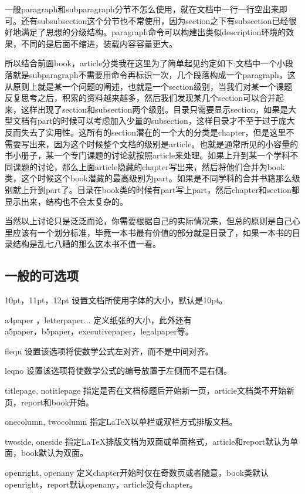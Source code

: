 \documentclass[12pt,oneside]{book}
\begin{document}
\begin{common-format}
一般paragraph和subparagraph分节不怎么使用，就在文档中一行一行空出来即可。还有subsubsection这个分节也不常使用，因为section之下有subsection已经很好地满足了思想的分级结构。paragraph命令可以构建出类似description环境的效果，不同的是后面不缩进，装载内容容量更大。

所以结合前面book，article分类我在这里为了简单起见约定如下:文档中一个小段落就是subparagraph不需要用命令再标识一次，几个段落构成一个paragraph，这从原则上就是某一个问题的阐述，也就是一个section级别，当我们对某一个课题反复思考之后，积累的资料越来越多，然后我们发现某几个section可以合并起来，这样出现了section和subsection两个级别。目录只需要显示section，如果是大型文档有part的时候可以考虑加入少量的subsection，这样目录才不至于过于庞大反而失去了实用性。这所有的section潜在的一个大的分类是chapter，但是这里不需要写出来，因为这个时候整个文档的级别是article。也就是通常所见的小容量的书小册子，某一个专门课题的讨论就按照article来处理。如果上升到某一个学科不同课题的讨论，那么上面article隐藏的chapter写出来，然后将他们合并为book类，这个时候这个book潜藏的最高级别为part。如果是不同学科的合并书籍那么级别就上升到part了。目录在book类的时候有part写上part，然后chapter和section都显示出来，结构也不会太复杂的。

当然以上讨论只是泛泛而论，你需要根据自己的实际情况来，但总的原则是自己心里应该有一个划分标准，毕竟一本书最有价值的部分就是目录了，如果一本书的目录结构是乱七八糟的那么这本书不值一看。

\subsection{一般的可选项}
10pt，11pt，12pt      设置文档所使用字体的大小，默认是10pt。

a4paper ，letterpaper...      定义纸张的大小，此外还有\\a5paper，b5paper，executivepaper，legalpaper等。

fleqn       设置该选项将使数学公式左对齐，而不是中间对齐。

leqno       设置该选项将使数学公式的编号放置于左侧而不是右侧。

titlepage, notitlepage       指定是否在文档标题后开始新一页，article文档类不开始新页，report和book开始。

onecolumn, twocolumn       指定LaTeX以单栏或双栏方式排版文档。

twoside, oneside       指定LaTeX排版文档为双面或单面格式，article和report默认为单面，book默认为双面。

openright, openany       定义chapter开始时仅在奇数页或者随意，book类默认openright，report默认openany，article没有chapter。





\end{common-format}
\end{document}
